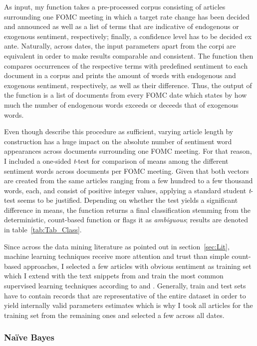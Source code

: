 As input, my function takes a pre-processed corpus consisting of articles surrounding one FOMC meeting in which a target rate change has been decided and announced as well as a list of terms that are indicative of endogenous or exogenous sentiment, respectively; finally, a confidence level has to be decided ex ante. Naturally, across dates, the input parameters apart from the corpi are equivalent in order to make results comparable and consistent. The function then compares occurrences of the respective terms with predefined sentiment to each document in a corpus and prints the amount of words with endogenous and exogenous sentiment, respectively, as well as their difference. Thus, the output of the function is a list of documents from every FOMC date which states by how much the number of endogenous words exceeds or deceeds that of exogenous words. 

Even though \textcite{Meyer2008} describe this procedure as sufficient, varying article length by construction has a huge impact on the absolute number of sentiment word appearances across documents surrounding one FOMC meeting. For that reason, I included a one-sided \textit{t}-test for comparison of means among the different sentiment words across documents per FOMC meeting. Given that both vectors are created from the same articles ranging from a few hundred to a few thousand words, each, and consist of positive integer values, applying a standard student \textit{t}-test seems to be justified. Depending on whether the test yields a significant difference in means, the function returns a final classification stemming from the deterministic, count-based function or flags it as \textit{ambiguous}; results are denoted in table~\vref{tab:Tab_Class}.

Since across the data mining literature as pointed out in section~\ref{sec:Lit}, machine learning techniques receive more attention and trust than simple count-based approaches, I selected a few articles with obvious sentiment as training set which I extend with the text snippets from \textcite{Ellingsen.2003} and train the most common supervised learning techniques according to \textcite{Liu.2010} and \textcite{Feldman.2013}. Generally, train and test sets have to contain records that are representative of the entire dataset in order to yield internally valid parameters estimates which is why I took all articles for the training set from the remaining ones and selected a few across all dates. 

\subsubsection{Na\"{i}ve Bayes} %

